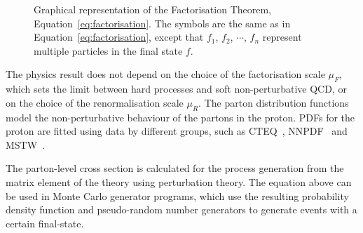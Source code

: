 \begin{figure}[tpbp]
\centering
{}
\caption{Graphical representation of the Factorisation Theorem, Equation~\ref{eq:factorisation}. The symbols are the same as in Equation~\ref{eq:factorisation}, except that $f_1$, $f_2$, $\cdots$, $f_n$ represent multiple particles in the final state $f$.}
\label{fig:factorisation}
\end{figure}

The physics result does not depend on the choice of the factorisation scale $\mu_F$, which sets the limit between hard processes and soft non-perturbative QCD, or on the choice
of the renormalisation scale $\mu_R$.
The parton distribution functions model the non-perturbative behaviour of the partons in the proton.
PDFs for the proton are fitted using data by different groups,
such as CTEQ~\cite{cteq6,ct10}, NNPDF~\cite{nnpdf} and MSTW~\cite{mstw}.%

The parton-level cross section is calculated for the process generation from the matrix element of the theory using perturbation theory. The equation above can be used
in Monte Carlo generator programs, which use the resulting probability density function and pseudo-random number generators to generate events with a certain final-state.

